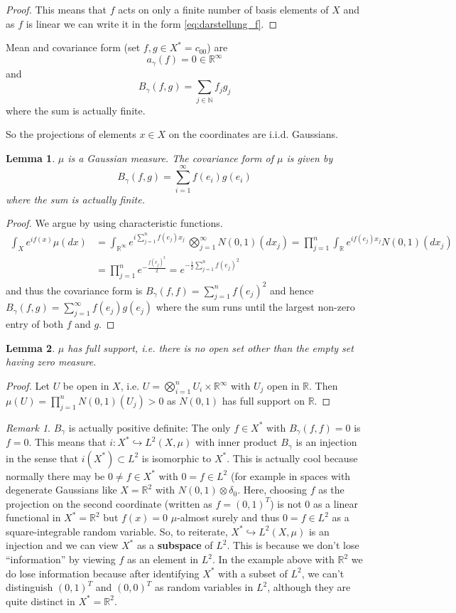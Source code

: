 \documentclass{scrartcl}
\newtheorem{lemma}{Lemma}
\theoremstyle{definition}
\theoremstyle{remark}
\newtheorem{remark}{Remark}
\newcommand{\N}{\mathbb N}
\newcommand{\R}{\mathbb R}
\begin{document}
{\begin{proof}
This means that $f$ acts on only a finite number of basis elements of $X$ and as $f$ is linear we can write it in the form \eqref{eq:darstellung_f}.
\end{proof}

 Mean and covariance form (set $f,g\in X^*=c_{00}$) are
\[a_\gamma(f) = 0\in\R^\infty\]
and 
\[B_\gamma(f, g) = \sum_{j\in\N} f_j g_j \]
 where the sum is actually finite.
 
 

So the projections of elements $x\in X$ on the coordinates are i.i.d. Gaussians.
\begin{lemma}\label{lem:Gaussian}
$\mu$ is a Gaussian measure. The covariance form of $\mu$ is given by
\[ B_\gamma(f,g) = \sum_{i=1}^\infty f(e_i)g(e_i) \]
where the sum is actually finite.
\end{lemma}
\begin{proof}
We argue by using characteristic functions. 
\begin{align*}
\int_X e^{if(x)}\mu(dx) &= \int_{\R^\infty} e^{i\sum_{j=1}^n f(e_j) x_j}\, \bigotimes_{j=1}^\infty N(0,1)(dx_j) = \prod_{j=1}^n \int_\R e^{if(e_j)x_j}N(0,1)(dx_j)\\
&= \prod_{j=1}^n e^{-\frac{f(e_j)^2}{2}} = e^{-\frac{1}{2}\sum_{j=1}^n f(e_j)^2}
\end{align*}
and thus the covariance form is $B_\gamma(f, f) = \sum_{j=1}^n f(e_j)^2$ and hence $B_\gamma(f,g)=\sum_{j=1}^\infty f(e_j)g(e_j)$ where the sum runs until the largest non-zero entry of both $f$ and $g$.
\end{proof}
\begin{lemma}
$\mu$ has full support, i.e. there is no open set other than the empty set having zero measure.
\end{lemma}
\begin{proof}
Let $U$ be open in $X$, i.e. $U = \bigotimes_{i=1}^n U_i \times \R^\infty$ with $U_j$ open in $\R$. Then $\mu(U) = \prod_{j=1}^n N(0,1)(U_j) > 0$ as $N(0,1)$ has full support on $\R$.
\end{proof}
\begin{remark}
$B_\gamma$ is actually positive definite: The only $f\in X^*$ with $B_\gamma(f, f) = 0$ is $f = 0$. This means that $i: X^*\hookrightarrow L^2(X, \mu)$ with inner product $B_\gamma$ is an injection in the sense that $i(X^*) \subset L^2$ is isomorphic to $X^*$. This is actually cool because normally there may be $0 \neq f \in X^*$ with $0 = f \in L^2$ (for example in spaces with degenerate Gaussians like $X= \R^2$ with $N(0,1) \otimes \delta_0$. Here, choosing $f$ as the projection on the second coordinate (written as $f = (0,1)^T$) is not $0$ as a linear functional in $X^* = \R^2$ but $f(x) = 0$ $\mu$-almost surely and thus $0 = f\in L^2$ as a square-integrable random variable.
So, to reiterate, $X^*\hookrightarrow L^2(X, \mu)$ is an injection and we can view $X^*$ as a \textbf{subspace} of $L^2$. This is because we don't lose ``information'' by viewing $f$ as an element in $L^2$. In the example above with $\R^2$ we do lose information because after identifying $X^*$ with a subset of $L^2$, we can't distinguish $(0,1)^T$ and $(0,0)^T$ as random variables in $L^2$, although they are quite distinct in $X^* = \R^2$.
\end{remark}

}
\end{document}
